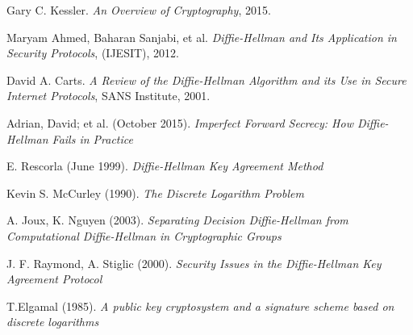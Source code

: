 \documentclass[a4paper]{article}
\begin{document}
\appendix

\begin{thebibliography}{9}

 Gary C. Kessler. \emph{An Overview of Cryptography}, 2015.

 Maryam Ahmed, Baharan Sanjabi, et al. \emph{Diffie-Hellman and Its Application in Security Protocols}, (IJESIT), 2012.

 David A. Carts. \emph{A Review of the Diffie-Hellman Algorithm and its Use in Secure Internet Protocols}, SANS Institute, 2001.

 Adrian, David; et al. (October 2015). \emph{Imperfect Forward Secrecy: How Diffie-Hellman Fails in Practice}


 E. Rescorla (June 1999). \emph{Diffie-Hellman Key Agreement Method}

 Kevin S. McCurley (1990). \emph{The Discrete Logarithm Problem}

 A. Joux, K. Nguyen (2003). \emph{Separating Decision Diffie-Hellman from Computational Diffie-Hellman in Cryptographic Groups}

 J. F. Raymond, A. Stiglic (2000). \emph{Security Issues in the Diffie-Hellman Key Agreement Protocol}

 T.Elgamal (1985). \emph{A public key cryptosystem and a signature scheme based on discrete logarithms}


\end{thebibliography}


\end{document}

